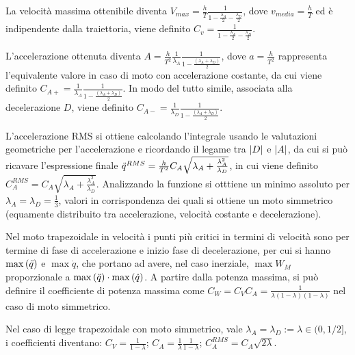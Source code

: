 La velocità massima ottenibile diventa \(V_{max} = \frac{h}{T} \frac{1}{1-\frac{\lambda_A}{2}-\frac{\lambda_D}{2}}\), dove \(v_{media} = \frac{h}{T}\) ed è indipendente dalla traiettoria, viene definito \(C_v = \frac{1}{1-\frac{\lambda_A}{2}-\frac{\lambda_D}{2}}\).

L'accelerazione ottenuta diventa \(A=\frac{h}{T^2} \frac{1}{\lambda_A}\frac{1}{1-\frac{\left(\lambda_A + \lambda_D \right)}{2}}\), dove \(a = \frac{h}{T^2}\) rappresenta l'equivalente valore in caso di moto con accelerazione costante, da cui viene definito \(C_{A+} = \frac{1}{\lambda_A}\frac{1}{1-\frac{\left(\lambda_A + \lambda_D \right)}{2}}\).
In modo del tutto simile, associata alla decelerazione \(D\), viene definito \(C_{A-} = \frac{1}{\lambda_D}\frac{1}{1-\frac{\left(\lambda_A + \lambda_D \right)}{2}}\).

L'accelerazione RMS si ottiene calcolando l'integrale usando le valutazioni geometriche per l'accelerazione e ricordando il legame tra \(\left|D\right|\) e \(\left|A\right|\), da cui si può ricavare l'espressione finale \(\Ddot{q}^{RMS} = \frac{h}{T^2} C_A \sqrt{\lambda_A + \frac{\lambda_A^2}{\lambda_D}}\), in cui viene definito \(C_A^{RMS} = C_A \sqrt{\lambda_A + \frac{\lambda_A^2}{\lambda_D}}\).
Analizzando la funzione si otttiene un minimo assoluto per \(\lambda_A=\lambda_D =\frac{1}{3}\), valori in corrispondenza dei quali si ottiene un moto simmetrico (equamente distribuito tra accelerazione, velocità costante e decelerazione).

Nel moto trapezoidale in velocità i punti più critici in termini di velocità sono per termine di fase di accelerazione e inizio fase di decelerazione, per cui si hanno \(\operatorname{max}\left(\Ddot{q}\right)\) e \(\max{\dot{q}}\), che portano ad avere, nel caso inerziale, \(\max{W_M}\) proporzionale a \(\operatorname{max}\left(\Ddot{q}\right) \cdot \operatorname{max}\left(\dot{q}\right)\).
A partire dalla potenza massima, si può definire il coefficiente di potenza massima come \(C_W = C_V C_A = \frac{1}{\lambda(1-\lambda)(1-\lambda)}\) nel caso di moto simmetrico.

Nel caso di legge trapezoidale con moto simmetrico, vale \(\lambda_A=\lambda_D := \lambda \in (0,1/2]\), i coefficienti diventano: \(C_V = \frac{1}{1-\lambda}\); \(C_A = \frac{1}{\lambda}\frac{1}{1-\lambda}\); \(C_A^{RMS} = C_A \sqrt{2\lambda}\).

